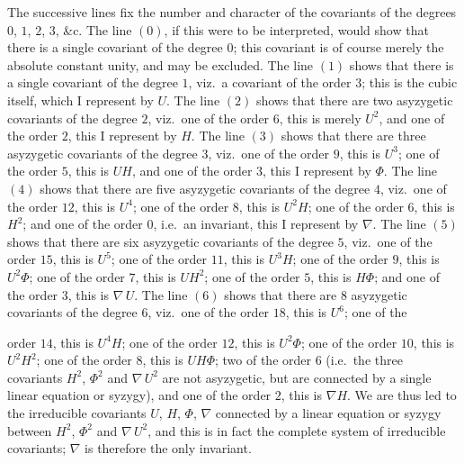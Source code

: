 \documentclass[11pt,a4paper]{book}
\begin{document}
The successive lines fix the number and character of the covariants of the degrees $0$, $1$, $2$, $3$, \&c. The line $(0)$, if this were to be interpreted, would show that there is a single covariant of the degree $0$; this covariant is of course merely the absolute constant unity, and may be excluded. The line $(1)$ shows that there is a single covariant of the degree $1$, viz.\ a covariant of the order $3$; this is the cubic itself, which I represent by $U$. The line $(2)$ shows that there are two asyzygetic covariants of the degree $2$, viz.\ one of the order $6$, this is merely $U^{2}$, and one of the order $2$, this I represent by $H$. The line $(3)$ shows that there are three asyzygetic covariants of the degree $3$, viz.\ one of the order $9$, this is $U^{3}$; one of the order $5$, this is $UH$, and one of the order $3$, this I represent by $\Phi$. The line $(4)$ shows that there are five asyzygetic covariants of the degree $4$, viz.\ one of the order $12$, this is $U^{4}$; one of the order $8$, this is $U^{2}H$; one of the order $6$, this is $H^{2}$; and one of the order $0$, i.e.\ an invariant, this I represent by $\nabla$. The line $(5)$ shows that there are six asyzygetic covariants of the degree $5$, viz.\ one of the order $15$, this is $U^{5}$; one of the order $11$, this is $U^{3}H$; one of the order $9$, this is $U^{2}\Phi$; one of the order $7$, this is $UH^{2}$; one of the order $5$, this is $H\Phi$; and one of the order $3$, this is $\nabla\,U$. The line $(6)$ shows that there are $8$ asyzygetic covariants of the degree $6$, viz.\ one of the order $18$, this is $U^{6}$; one of the

\clearpage
\setcounter{page}{262}

order $14$, this is $U^{4}H$; one of the order $12$, this is $U^{2}\Phi$; one of the order $10$, this is $U^{2}H^{2}$; one of the order $8$, this is $UH\Phi$; two of the order $6$ (i.e.\ the three covariants $H^{2}$, $\Phi^{2}$ and $\nabla\,U^{2}$ are not asyzygetic, but are connected by a single linear equation or syzygy), and one of the order $2$, this is $\nabla H$. We are thus led to the irreducible covariants $U$, $H$, $\Phi$, $\nabla$ connected by a linear equation or syzygy between $H^{2}$, $\Phi^{2}$ and $\nabla\,U^{2}$, and this is in fact the complete system of irreducible covariants; $\nabla$ is therefore the only invariant.
\end{document}
